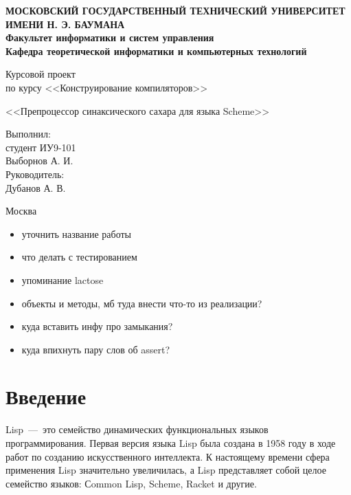 \documentclass[12pt,a4paper,oneside]{extarticle}
\begin{document}
\pgfplotsset{compat=1.8}

\thispagestyle{empty}
\newpage
{
\centering


\textbf{
МОСКОВСКИЙ ГОСУДАРСТВЕННЫЙ ТЕХНИЧЕСКИЙ УНИВЕРСИТЕТ ИМЕНИ Н. Э. БАУМАНА \\
Факультет информатики и систем управления \\
Кафедра теоретической информатики и компьютерных технологий}
\bigskip
\bigskip
\bigskip
\bigskip
\bigskip
\bigskip
\bigskip

\vfill


Курсовой проект \\
по курсу <<Конструирование компиляторов>>

\bigskip

{\large <<Препроцессор синаксического сахара для языка Scheme>>}
\bigskip

\vfill



\hfill\parbox{4cm} {
Выполнил:\\
студент ИУ9-101 \hfill \\
Выборнов А. И.\hfill \medskip\\
Руководитель:\\
Дубанов А. В.\hfill
}


\vspace{\fill}

Москва \number\year
\clearpage
}


\tableofcontents

\clearpage

\begin{itemize}
    \item уточнить название работы
    \item что делать с тестированием
    \item упоминание lactose
    \item объекты и методы, мб туда внести что-то из реализации?
    \item куда вставить инфу про замыкания?
    \item куда впихнуть пару слов об assert?
\end{itemize}

\clearpage

\section*{Введение}
    Lisp~---~это семейство динамических функциональных языков программирования.
    Первая версия языка Lisp была создана в 1958 году в ходе работ по созданию искусственного интеллекта.
    К настоящему времени сфера применения Lisp значительно увеличилась, а Lisp представляет собой целое семейство языков: Сommon Lisp, Scheme, Racket и другие. 
\end{document}
